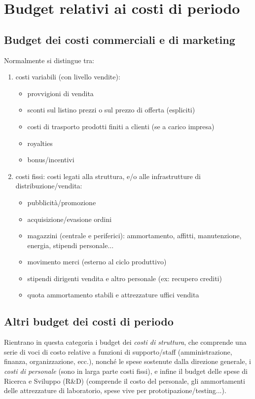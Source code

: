 \section{Budget relativi ai costi di periodo}
\subsection{Budget dei costi commerciali e di marketing}
Normalmente si distingue tra:
\begin{enumerate}
	\item costi variabili (con livello vendite):
	\begin{itemize}
		\item provvigioni di vendita
		\item sconti sul listino prezzi o sul prezzo di offerta (espliciti)
		\item costi di trasporto prodotti finiti a clienti (se a carico impresa)
		\item royalties
		\item bonus/incentivi
	\end{itemize}
	\item costi fissi: costi legati alla struttura, e/o alle infrastrutture di
	distribuzione/vendita:
	\begin{itemize}
		\item pubblicità/promozione
		\item acquisizione/evasione ordini
		\item magazzini (centrale e periferici): ammortamento, affitti, manutenzione,
		energia, stipendi personale...
		\item movimento merci (esterno al ciclo produttivo)
		\item stipendi dirigenti vendita e altro personale (ex: recupero crediti)
		\item quota ammortamento stabili e attrezzature uffici vendita
	\end{itemize}
\end{enumerate} 

\subsection{Altri budget dei costi di periodo}
Rientrano in questa categoria i budget dei \emph{costi di struttura}, che
comprende una serie di voci di costo relative a funzioni di
supporto/staff (amministrazione, finanza, organizzazione, ecc.),
nonché le spese sostenute dalla direzione generale, i \emph{costi di personale} (sono in larga parte costi fissi), e infine il budget delle spese di Ricerca e Sviluppo (R\&D) (comprende il costo del personale, gli ammortamenti delle
attrezzature di laboratorio, spese vive per prototipazione/testing...).

